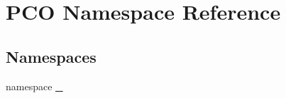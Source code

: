 \hypertarget{namespacePCO}{}\section{P\+CO Namespace Reference}
\label{namespacePCO}
\subsection*{Namespaces}
\begin{DoxyCompactItemize}
\item 
namespace \hyperlink{namespacePCO_1_1__0}{\+\_}
\end{DoxyCompactItemize}
